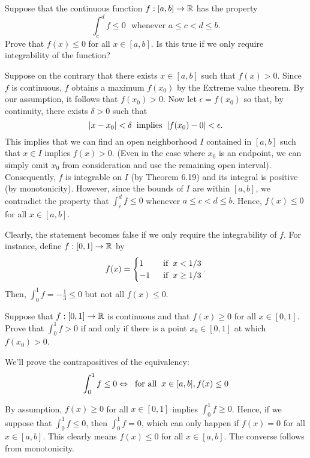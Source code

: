 \documentclass[letterpaper, twoside, 12pt]{book}
\begin{document}
\begin{exercise}[5]
  Suppose that the continuous function \(f:[a,b]\to\mathbb R\) has the property
  \[
    \int_c^d f\leq 0
      \text{~~whenever~}
    a\leq c<d\leq b
  .\]
  Prove that \(f(x)\leq 0\) for all \(x\in[a,b]\). Is this true if we only
  require integrability of the function?
\end{exercise}

\begin{solution}
    Suppose on the contrary that there exists \(x \in [a,b]\) such that
    \(f(x) > 0\). Since \(f\) is continuous, \(f\) obtains a maximum \(f(x_0)\)
    by the Extreme value theorem. By our assumption, it follows that 
    \(f(x_0) > 0\). Now let \(\epsilon = f(x_0)\) so that, by continuity,
    there exists \(\delta > 0\) such that 
    \[ |x - x_0| < \delta \hspace{2mm} \text{implies} \hspace{2mm} |f(x_0) - 0| < \epsilon .\]
    This implies that we can find an open neighborhood \(I\) contained
    in \([a,b]\) such that \(x \in I\) implies \(f(x) > 0\). (Even
    in the case where \(x_0\) is an endpoint, we can simply omit
    \(x_0\) from consideration  and use the remaining open interval).
    Consequently, \(f\) is integrable on \(I\) (by Theorem 6.19) 
    and its integral is positive (by monotonicity). However, since 
    the bounds of \(I\) are within \([a,b]\), we contradict the 
    property that \(\int_c^d f \leq 0\) whenever \(a \leq c < d \leq b\).
    Hence, \(f(x) \leq 0\) for all \(x \in [a,b]\).

    Clearly, the statement becomes false if we only require the
    integrability of \(f\). For instance, define \(f:[0,1] \rightarrow \mathbb R\)
    by \[ f(x) = \begin{cases} 1  &\hspace{2mm} \text{if} \hspace{2mm} x < 1/3 \\
                              -1 &\hspace{2mm} \text{if} \hspace{2mm} x \geq 1/3 \\
                \end{cases}. \]
    Then, \(\int_0^1 f = -\frac{1}{3} \leq 0 \) but not all
    \(f(x) \leq 0\).
\end{solution}


\begin{exercise}[6]
  Suppose that \(f:[0,1]\to\mathbb R\) is continuous and that \(f(x)\geq 0\) for
  all \(x\in[0,1]\). Prove that \(\int_0^1 f>0\) if and only if there is a
  point \(x_0\in[0,1]\) at which \(f(x_0)>0\).
\end{exercise}

\begin{solution}
    We'll prove the contrapositives of the equivalency:
    \[ \int_0^1 f \leq 0 \Leftrightarrow \hspace{2mm} \text{for all} \hspace{2mm} x \in [a,b], f(x) \leq 0 \]
    
    By assumption, \(f(x) \geq 0\) for all \(x \in [0, 1]\)
    implies \(\int_0^1 f \geq 0\). Hence, if we suppose that
    \(\int_0^1 f \leq 0\), then \(\int_0^1 f = 0\), which can
    only happen if \(f(x) = 0\) for all \(x \in [a,b]\). This
    clearly means \(f(x) \leq 0 \) for all \(x \in [a,b]\).
    The converse follows from monotonicity.
\end{solution}
\end{document}
